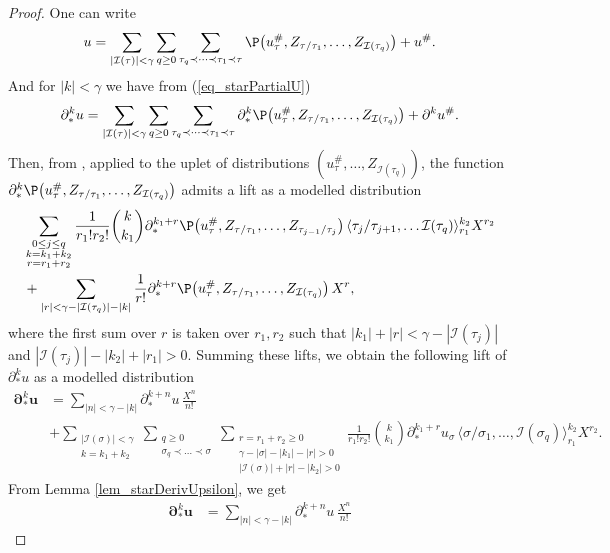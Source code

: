 \documentclass[11pt]{preprint}
\newcommand{\mcI}{\mathcal{I}}
\def\eqref#1{(\ref{#1})}
\renewcommand{\lg}{\langle}
\newcommand{\rg}{\rangle}
\begin{document}
	\begin{proof}
		One can write
		$$
		u = \sum_{ |\mcI(\tau)|<\gamma}\sum_{q\geq 0}\sum_{\tau_q\prec\dots\prec\tau_1\prec\tau} \P\big( u_\tau^\#, Z_{\tau/\tau_1}, \dots, Z_{\mcI(\tau_q)}    \big) + u^\#.
		$$		
	And for $|k|<\gamma$ we have from \eqref{eq_starPartialU}
		$$
		\partial_*^{k}u = \sum_{|\mcI(\tau)|<\gamma}\sum_{q\geq 0}\sum_{\tau_q\prec\dots\prec\tau_1\prec\tau} \partial_*^{k}\P\big( u_\tau^\#, Z_{\tau/\tau_1}, \dots, Z_{\mcI(\tau_q)}    \big) + \partial^{k}u^\#.
		$$
		Then, from \cite[Theorem 1]{LocalExpansionsParacSystems}, applied to the uplet of distributions $(u_\tau^\#,\dots,Z_{\mcI(\tau_q)})$, the function 
		$\partial_*^{k}\P\big( u_\tau^\#, Z_{\tau/\tau_1}, \dots, Z_{\mcI(\tau_q)}    \big)$ admits a lift as a modelled distribution
		\begin{align*}
		&\sum_{\substack{0\leq j\leq q \\ k=k_1+k_2 \\ r=r_1+r_2 }} \frac{1}{r_1!r_2!}\binom{k}{k_1}\partial^{k_1+r}_*\P\big( u_\tau^\#, Z_{\tau/\tau_1}, \dots, Z_{\tau_{j-1}/\tau_{j}}\big) \, \lg \tau_j/\tau_{j+1},\dots \mcI(\tau_q)   \rg^{k_2}_{r_1}X^{r_2}
		\\
		&+\sum_{|r|<\gamma-|\mcI(\tau_q)|-|k|} \frac{1}{r!} \partial_*^{k+r}\P\big( u_\tau^\#, Z_{\tau/\tau_1}, \dots, Z_{\mcI(\tau_q)}    \big) \,  X^r,
		\end{align*}
		where the first sum over $r$ is taken over $r_1,r_2$ such that $|k_1|+|r|<\gamma-|\mcI(\tau_j)|$ and $|\mcI(\tau_j)|-|k_2|+|r_1|>0$.
		 Summing these lifts, we obtain the following lift of $\partial^{k}_*u$ as a modelled distribution
		\begin{align*}
			{\bm \partial_*^{k}}{\bm u} &= \sum_{|n|<\gamma-|k|}\partial_*^{k+n} u \, \frac{X^n}{n!} 
			\\&+ \sum_{\substack{|\mcI(\sigma)|<\gamma \\k=k_1+k_2 }}\sum_{\substack{q\geq 0 \\ \sigma_q\prec\dots\prec\sigma}}\sum_{\substack{ r=r_1+r_2 \geq0 \\ \gamma-|\sigma|-|k_1|-|r|>0\\|\mcI(\sigma)|+|r|-|k_2|>0 }} \frac{1}{r_1!r_2!}\binom{k}{k_1}\partial^{k_1+r}_* u_\sigma \, \lg \sigma/\sigma_1,\dots,\mcI(\sigma_q)    \rg^{k_2}_{r_1}X^{r_2} .
		\end{align*}
		From Lemma \ref{lem_starDerivUpsilon}, we get 
		\begin{align*}
				{\bm \partial_*^{k}}{\bm u} &= \sum_{|n|<\gamma-|k|}\partial_*^{k+n} u \, \frac{X^n}{n!} 

\end{align*}
\end{proof}
\end{document}
